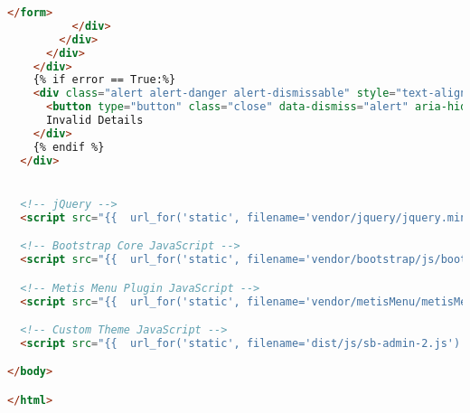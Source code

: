 \begin{lstlisting}[language=HTML]
            </form>
          </div>
        </div>
      </div>
    </div>
    {% if error == True:%}
    <div class="alert alert-danger alert-dismissable" style="text-align: center">
      <button type="button" class="close" data-dismiss="alert" aria-hidden="true">&times;</button>
      Invalid Details
    </div>
    {% endif %}
  </div>


  <!-- jQuery -->
  <script src="{{  url_for('static', filename='vendor/jquery/jquery.min.js') }}"></script>

  <!-- Bootstrap Core JavaScript -->
  <script src="{{  url_for('static', filename='vendor/bootstrap/js/bootstrap.min.js') }}"></script>

  <!-- Metis Menu Plugin JavaScript -->
  <script src="{{  url_for('static', filename='vendor/metisMenu/metisMenu.min.js') }}"></script>

  <!-- Custom Theme JavaScript -->
  <script src="{{  url_for('static', filename='dist/js/sb-admin-2.js') }}"></script>

</body>

</html>

\end{lstlisting}
\pagebreak


